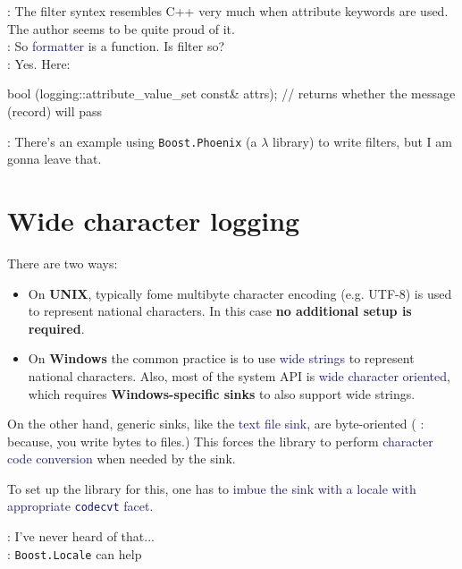 \documentclass[dvipsnames]{article}
\newcommand{\mycola}{MidnightBlue}
\newcommand{\mycolb}{Mahogany}
\newcommand{\cola}[1]{\textcolor{\mycola}{#1}}
\newcommand{\colb}[1]{\textcolor{\mycolb}{#1}}
\begin{document}
\begin{tcolorbox}
   : The filter syntex resembles C++ very much when attribute
  keywords are used. The author seems to be quite proud of it.\\
   : So \cola{formatter} is a function. Is \colb{filter} so?\\
   : Yes. Here:
\end{tcolorbox}

\begin{simplec}
  bool (logging::attribute_value_set const& attrs); // returns whether the message (record) will pass
\end{simplec}

 : There's an example using \texttt{Boost.Phoenix} (a $\lambda$
library) to write filters, but I am gonna leave that.

\section{Wide character logging}

There are two ways:
\begin{itemize}
\item On \textbf{UNIX}, typically fome multibyte character encoding (e.g. UTF-8) is used
  to represent national characters. In this case \textbf{no additional setup is
    required}.
\item On \textbf{Windows} the common practice is to use \cola{wide strings} to
  represent national characters. Also, most of the system API is \cola{wide
    character oriented}, which requires \textbf{Windows-specific sinks} to also
  support wide strings.
\end{itemize}
On the other hand, generic sinks, like the \cola{text file sink}, are
byte-oriented ( : because, you write bytes to files.) This forces
the library to perform \cola{character code conversion} when needed by the sink.

To set up the library for this, one has to \cola{imbue the sink with a locale
  with appropriate \texttt{codecvt} facet}.
\begin{tcolorbox}
   : I've never heard of that...\\
   : \texttt{Boost.Locale} can help
\end{tcolorbox}
\end{document}
